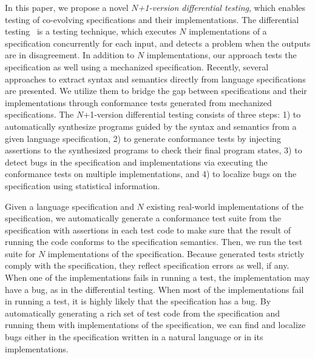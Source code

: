 In this paper, we propose a novel \textit{$N$+1-version differential testing}, which
enables testing of co-evolving specifications and their implementations.  The
differential testing~\cite{diff-test} is a testing technique, which executes $N$
implementations of a specification concurrently for each input, and detects a
problem when the outputs are in disagreement.  In addition to $N$
implementations, our approach tests the specification as well using a
mechanized specification.  Recently, several approaches to extract syntax and
semantics directly from language specifications are presented\cite{jiset,
extract-x86, extract-arm}.  We utilize them to bridge the gap between
specifications and their implementations through conformance tests generated
from mechanized specifications.  The $N$+1-version differential testing consists of
three steps: 1) to automatically synthesize programs guided by the syntax and
semantics from a given language specification, 2) to generate conformance tests
by injecting assertions to the synthesized programs to check their final program
states, 3) to detect bugs in the specification and implementations
via executing the conformance tests on multiple implementations, and 4) to
localize bugs on the specification using statistical information.

Given a language specification and $N$ existing real-world
implementations of the specification, we
automatically generate a conformance test suite from the specification with
assertions in each test code to make sure that the result of running the code
conforms to the specification semantics.  Then, we run the test suite for $N$
implementations of the specification.  Because generated tests strictly comply
with the specification, they reflect specification errors as well, if any.  When
one of the implementations fails in running a test, the
implementation may have a bug, as in the differential testing.  When
most of the implementations fail in running a test, it is highly likely that
the specification has a bug.  By automatically generating a rich set of test
code from the specification and running them with implementations of the
specification, we can find and localize bugs either in the specification written
in a natural language or in its implementations.

